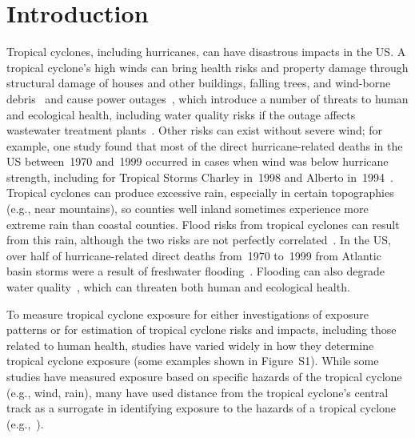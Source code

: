 \section*{Introduction}

Tropical cyclones, including hurricanes, can have disastrous impacts in the
\ac{US}. A tropical cyclone's high winds can bring health risks
and property damage through structural damage of houses and other buildings,
falling trees, and wind-borne debris~\citep{rappaport2000} and cause power
outages~\citep{liu2005, han2009}, which introduce a number of threats to human
and ecological health, including water quality risks if the outage affects
wastewater treatment plants~\citep{mallin2006}.  Other risks can exist without
severe wind; for example, one study found that most of the direct
hurricane-related deaths in the \ac{US} between~1970 and~1999 occurred in cases
when wind was below hurricane strength, including for Tropical Storms Charley
in~1998 and Alberto in~1994~\citep{rappaport2000}.  Tropical cyclones can
produce excessive rain, especially in certain topographies (e.g., near
mountains), so counties well inland sometimes experience more extreme rain than
coastal counties. Flood risks from tropical cyclones can result from this rain,
although the two risks are not perfectly correlated~\citep{chen2015}. In the
\ac{US}, over half of hurricane-related direct deaths from~1970 to~1999 from
Atlantic basin storms were a result of freshwater flooding~\citep{rappaport2000}. 
Flooding can also degrade water quality~\citep{mallin2006}, which can threaten both 
human and ecological health.

To measure tropical cyclone exposure for either investigations of exposure
patterns or for estimation of tropical cyclone risks and impacts, including
those related to human health, studies have varied widely in how they determine
tropical cyclone exposure (some examples shown in Figure~S1). While some
studies have measured exposure based on specific hazards of the tropical
cyclone (e.g., wind, rain), many have used distance from the tropical
cyclone's central track as a surrogate in identifying exposure to the hazards
of a tropical cyclone (e.g.,~\citet{czajkowski2011, tansel2010, kinney2008,
caillouet2008increase}).  

